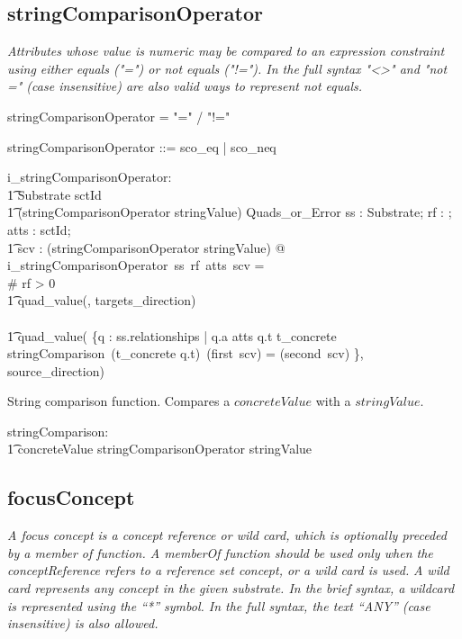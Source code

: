 \documentclass{article}
\def\bnf#1{{\scriptsize {{#1}} }}
\def\desc#1{{\small \textsl{{#1}} }}
\begin{document}
\subsection{stringComparisonOperator}
\begin{framed}
\desc{Attributes whose value is numeric may be compared to an expression constraint using either equals ("=") or not equals ("!="). In the full syntax "<>" and "not =" (case insensitive) are also  valid ways to represent not equals.}
\end{framed}

\begin{framed}
\noindent
\bnf{stringComparisonOperator = "=" / "!="}
\end{framed}


\begin{zed}
stringComparisonOperator ::= sco\_eq | sco\_neq
\end{zed}

\begin{gendef}
   i\_stringComparisonOperator: \\
\t1 Substrate \fun  \optional[reverseFlag] \fun \power sctId \fun \\
\t1 (stringComparisonOperator \cross stringValue) \fun Quads\_or\_Error
\where
    \forall ss : Substrate; rf : \optional[reverseFlag]; atts : \power sctId; \\
\t1 scv : (stringComparisonOperator \cross stringValue)  @ \\
    i\_stringComparisonOperator~ss~rf~atts~scv = \\
\IF \# rf > 0 \THEN \\
\t1 quad\_value(\emptyset, targets\_direction) \\
\ELSE \\
\t1 quad\_value( \{q : ss.relationships | q.a \in atts \land q.t \in \ran t\_concrete \land \\
stringComparison~(t\_concrete \inv q.t)~(first~scv) = (second~scv) \}, source\_direction)
 \end{gendef}


 String comparison function. Compares a $concreteValue$ with a $stringValue$.
 \begin{gendef}
    stringComparison: \\
\t1 concreteValue \fun stringComparisonOperator \pfun stringValue
 \end{gendef}





\subsection{focusConcept}
\begin{framed}
\desc{A focus concept is a concept reference or wild card, which is optionally preceded by a member of function. A memberOf function should be used only when the conceptReference refers to a reference set concept, or a wild card is used.}
\desc{A wild card represents any concept in the given substrate. In the brief syntax, a wildcard is represented using the ``*'' symbol. In the full syntax, the text ``ANY'' (case insensitive) is also allowed.}
\end{framed}
\end{document}
